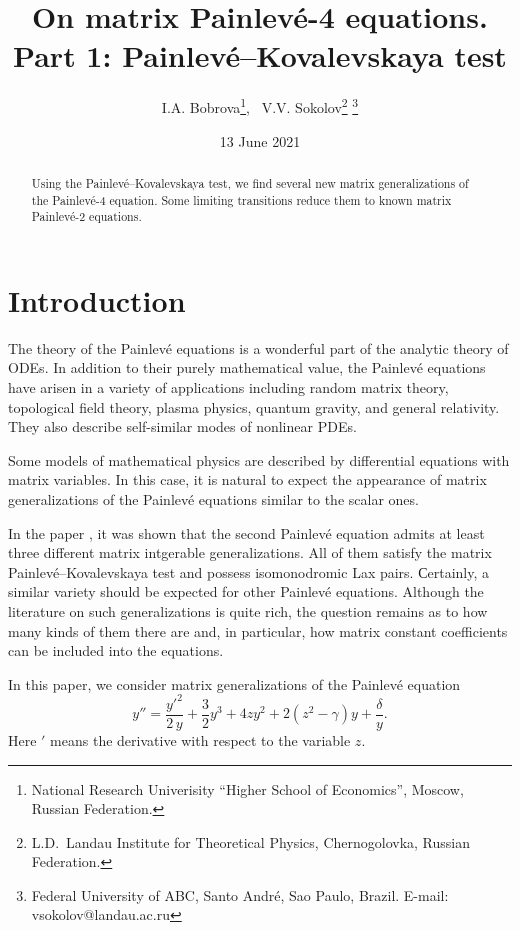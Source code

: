 \documentclass{article}
\title{On matrix Painlev\'e-4 equations. \\ Part 1: Painlev\'e--Kovalevskaya test}
\date{13 June 2021}
\author{I.A. Bobrova\thanks{National Research Univerisity ``Higher School of Economics'', Moscow, Russian Federation.},~ V.V. Sokolov\thanks{L.D.~Landau Institute for Theoretical Physics, Chernogolovka, Russian Federation.} \thanks{Federal University of ABC, Santo Andr\'e, Sao Paulo, Brazil. E-mail: vsokolov@landau.ac.ru}}
\theoremstyle{plain}
\DeclareMathOperator{\PIV}{P_{4}}
\newcommand{\PPainleve}{Painlev{\'e}}
\begin{document}
\maketitle

\begin{abstract}
Using the Painlev\'e--Kovalevskaya test, we find several new matrix generalizations of the Painlev\'e-4 equation. Some limiting transitions reduce them to known matrix \PPainleve-2 equations.
\medskip

\end{abstract}



\section{Introduction}

\qquad The theory of the Painlev\'e equations is a wonderful part of the analytic theory of ODEs. In addition to their purely mathematical value, the Painlev\'e equations have arisen in a variety of applications including
random matrix theory, topological field theory, plasma physics, quantum gravity, and general relativity.  They also describe self-similar modes
of nonlinear PDEs.

Some models of mathematical physics are described by differential equations with matrix variables. In this case, it is natural to expect the appearance of matrix generalizations of the Painlev\'e equations similar to the scalar ones.

In the paper \cite{Adler_Sokolov_2020_1}, it was shown that the second Painlev\'e equation admits at least three different matrix intgerable generalizations. All of them satisfy the matrix \PPainleve--Kovalevskaya test and possess isomonodromic Lax pairs.  Сertainly, a similar variety should be expected for other Painlev\'e equations. Although the literature on such generalizations is quite rich, the question remains as to how many kinds of them there are and, in particular, how matrix constant coefficients can be included into the equations.

In this paper, we consider matrix generalizations of the Painlev\'e equation $\PIV$ 
\begin{equation}\label{P4scal}
 y''= \frac{y'^2}{2\, y}  +\frac{3}{2} y^3+4z y^2 +2(z^2-\gamma) y+\frac{\delta}{y}.
\end{equation}
Here $'$ means the derivative with respect to  the variable $z$. 
\end{document}
